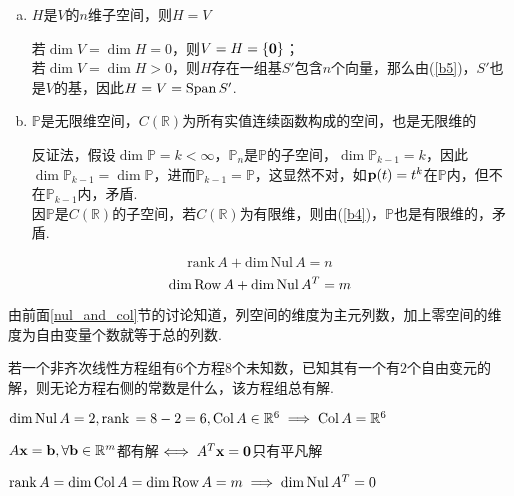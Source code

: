 \begin{theorem}
\begin{enumerate}[(a)]
\begin{analysis}
	\end{analysis}
	\item $H$是$V$的$n$维子空间，则$H=V$
	\begin{analysis}
	若$\dim V=\dim H=0$，则$V=H=\{\mathbf{0}\}$；\\
	若$\dim V=\dim H>0$，则$H$存在一组基$S'$包含$n$个向量，那么由(\ref{b5})，$S'$也是$V$的基，因此$H=V=\mathrm{Span}\, S'$.
	\end{analysis}
	\item $\mathbb{P}$是无限维空间，$C(\mathbb{R})$为所有实值连续函数构成的空间，也是无限维的
	\begin{analysis}
	反证法，假设$\dim\mathbb{P}=k<\infty$，$\mathbb{P}_n$是$\mathbb{P}$的子空间，$\dim\mathbb{P}_{k-1}=k$，因此$\dim\mathbb{P}_{k-1}=\dim\mathbb{P}$，进而$\mathbb{P}_{k-1}=\mathbb{P}$，这显然不对，如$\mathbf{p}(t)=t^k$在$\mathbb{P}$内，但不在$\mathbb{P}_{k-1}$内，矛盾.\\
	因$\mathbb{P}$是$C(\mathbb{R})$的子空间，若$C(\mathbb{R})$为有限维，则由(\ref{b4})，$\mathbb{P}$也是有限维的，矛盾.
	\end{analysis}
\end{enumerate}
\end{theorem}
\begin{theorem}[秩定理]
\label{rank_theo}
\[\mathrm{rank}\,A+\mathrm{dim}\,\mathrm{Nul}\,A=n\]
\[\mathrm{dim}\,\mathrm{Row}\, A+\mathrm{dim}\, \mathrm{Nul}\, A^T=m\]
\end{theorem}
\begin{analysis}
由前面\ref{nul_and_col}节的讨论知道，列空间的维度为主元列数，加上零空间的维度为自由变量个数就等于总的列数.
\end{analysis}
\begin{example}
若一个非齐次线性方程组有$6$个方程$8$个未知数，已知其有一个有$2$个自由变元的解，则无论方程右侧的常数是什么，该方程组总有解.
\end{example}
\begin{analysis}
$\mathrm{dim}\,\mathrm{Nul}\, A=2,\mathrm{rank}\,=8-2=6,\mathrm{Col}\, A\in\mathbb{R}^6\implies\mathrm{Col}\, A=\mathbb{R}^6$
\end{analysis}
\begin{example}
$A\mathbf{x}=\mathbf{b},\forall\mathbf{b}\in\mathbb{R}^m$都有解$\iff A^T\mathbf{x}=\mathbf{0}$只有平凡解
\end{example}
\begin{analysis}
$\mathrm{rank}\, A=\mathrm{dim}\,\mathrm{Col}\, A=\mathrm{dim}\,\mathrm{Row}\, A=m\implies\mathrm{dim}\,\mathrm{Nul}\, A^T=0$
\end{analysis}
